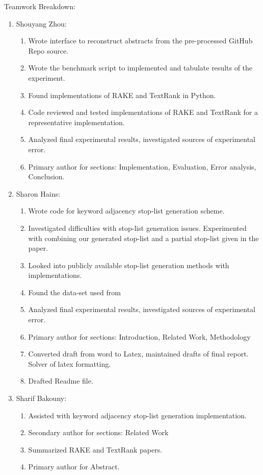 \documentclass[11pt,a4paper]{article}
\begin{document}
Teamwork Breakdown: 
\begin{enumerate}
	\small \itemsep0em 

	\item Shouyang Zhou:
	\begin{enumerate}
		\item Wrote interface to reconstruct abstracts from the pre-processed GitHub Repo source.
		\item Wrote the benchmark script to implemented and tabulate results of the experiment.
		\item Found implementations of RAKE and TextRank in Python.
		\item Code reviewed and tested implementations of RAKE and TextRank for a representative implementation.
		\item Analyzed final experimental results, investigated sources of experimental error.
		\item Primary author for sections: Implementation, Evaluation, Error analysis, Conclusion.

	\end{enumerate}

	\item Sharon Hains:
	\begin{enumerate}
		\item Wrote code for keyword adjacency stop-list generation scheme.
		\item Investigated difficulties with stop-list generation issues. Experimented with combining our generated stop-list and a partial stop-list given in the paper.
		\item Looked into publicly available stop-list generation methods with implementations. 
		\item Found the data-set used from \citet{hulth-2003-improved}
		\item Analyzed final experimental results, investigated sources of experimental error.
		\item Primary author for sections: Introduction, Related Work, Methodology
		\item Converted draft from word to Latex, maintained drafts of final report. Solver of latex formatting.
		\item Drafted Readme file.
	\end{enumerate}

	\item Sharif Bakouny:
	\begin{enumerate}
		\item Assisted with keyword adjacency stop-list generation implementation.
		\item Secondary author for sections: Related Work
		\item Summarized RAKE and TextRank papers.
		\item Primary author for Abstract.
	\end{enumerate}	

\normalsize
\end{enumerate}  
 
\end{document}
